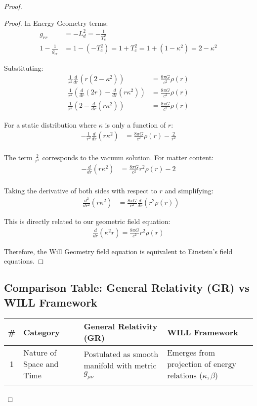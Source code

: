 \documentclass{article}
\begin{document}
\begin{proof}
\begin{proof}
In Energy Geometry terms:
\begin{align}
g_{rr} &= -L_d^2 = -\frac{1}{T_c^2} \\
1-\frac{1}{g_{rr}} &= 1-(-T_c^2) = 1+T_c^2 = 1+(1-\kappa^2) = 2-\kappa^2
\end{align}

Substituting:
\begin{align}
\frac{1}{r^2}\frac{d}{dr}(r(2-\kappa^2)) &= \frac{8\pi G}{c^2}\rho(r) \\
\frac{1}{r^2}\left(\frac{d}{dr}(2r) - \frac{d}{dr}(r\kappa^2)\right) &= \frac{8\pi G}{c^2}\rho(r) \\
\frac{1}{r^2}\left(2 - \frac{d}{dr}(r\kappa^2)\right) &= \frac{8\pi G}{c^2}\rho(r)
\end{align}

For a static distribution where $\kappa$ is only a function of $r$:
\begin{align}
-\frac{1}{r^2}\frac{d}{dr}(r\kappa^2) &= \frac{8\pi G}{c^2}\rho(r) - \frac{2}{r^2} \\
\end{align}

The term $\frac{2}{r^2}$ corresponds to the vacuum solution. For matter content:
\begin{align}
-\frac{d}{dr}(r\kappa^2) &= \frac{8\pi G}{c^2}r^2\rho(r) - 2 \\
\end{align}

Taking the derivative of both sides with respect to $r$ and simplifying:
\begin{align}
-\frac{d^2}{dr^2}(r\kappa^2) &= \frac{8\pi G}{c^2}\frac{d}{dr}(r^2\rho(r))
\end{align}

This is directly related to our geometric field equation:
\begin{align}
\frac{d}{dr}(\kappa^2 r) = \frac{8\pi G}{c^2}r^2\rho(r)
\end{align}

Therefore, the Will Geometry field equation is equivalent to Einstein's field equations.
\end{proof}
 
\subsection*{Comparison Table: General Relativity (GR) vs WILL Framework}

\begin{tabularx}{\textwidth}{@{}clXX@{}}
\toprule
\# & Category & \textbf{General Relativity (GR)} & \textbf{WILL Framework} \\
\midrule
1 & Nature of Space and Time & 
Postulated as smooth manifold with metric \( g_{\mu\nu} \) & 
Emerges from projection of energy relations (\( \kappa, \beta \)) \\
\addlinespace


\end{tabularx}
\end{proof}
\end{document}
